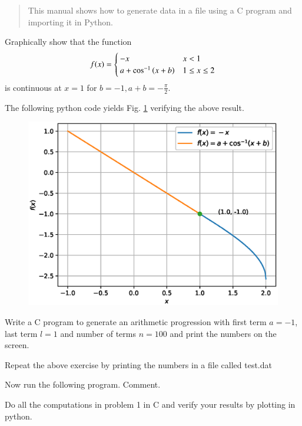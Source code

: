 \documentclass[journal,12pt,twocolumn]{IEEEtran}
\begin{document}
\bigskip

\begin{abstract}
This manual shows how to generate data in a file using a C program and importing it in Python.  
\end{abstract}

\begin{problem}
Graphically show that the function
%
\begin{equation}
f(x)=
\begin{cases}
-x & x < 1 \\
a + \cos^{-1}\left(x + b\right) & 1 \leq x \leq 2
\end{cases}
\end{equation}
%
is continuous at $x = 1$ for $b = -1, a + b =  - \frac{\pi}{2}$.  
\end{problem}
\solution
%
The following python code yields Fig. \ref{fig_5} verifying the above result.

\begin{figure}[!ht]
\begin{center}
\includegraphics[width=\columnwidth]{./figs/ee16b1005}
\end{center}
\label{fig_5}	
\end{figure}
%
\begin{problem}
Write a C program to generate an arithmetic progression with first term $a=-1$, last term $l=1$ and number of terms $n=100$ and print the numbers on the screen.
\end{problem}
\solution

\begin{problem}
Repeat the above exercise by printing the numbers in a file called test.dat
\end{problem}
\solution

\begin{problem}
Now run the following program.  Comment.
\end{problem}

\begin{problem}
Do all the computations in problem 1 in C and verify your results by plotting in python.
\end{problem}
\end{document}
